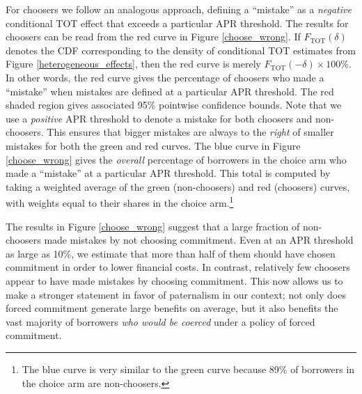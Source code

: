 \documentclass[11pt, a4paper]{article}
\begin{document}
For choosers we follow an analogous approach, defining a ``mistake'' as a \emph{negative} conditional TOT effect that exceeds a particular APR threshold.
The results for choosers can be read from the red curve in Figure \ref{choose_wrong}.
If $F_{\text{TOT}}(\delta)$ denotes the CDF corresponding to the density of conditional TOT estimates from Figure \ref{heterogeneous_effects}, then the red curve is merely $F_{\text{TOT}}(-\delta) \times 100\%$.
In other words, the red curve gives the percentage of choosers who made a ``mistake'' when mistakes are defined at a particular APR threshold.
The red shaded region gives associated 95\% pointwise confidence bounds.
Note that we use a \emph{positive} APR threshold to denote a mistake for both choosers and non-choosers. 
This ensures that bigger mistakes are always to the \emph{right} of smaller mistakes for both the green and red curves.
The blue curve in Figure \ref{choose_wrong} gives the \emph{overall} percentage of borrowers in the choice arm who made a ``mistake'' at a particular APR threshold.
This total is computed by taking a weighted average of the green (non-choosers) and red (choosers) curves, with weights equal to their shares in the choice arm.\footnote{The blue curve is very similar to the green curve because 89\% of borrowers in the choice arm are non-choosers.}



The results in Figure \ref{choose_wrong} suggest that a large fraction of non-choosers made mistakes by not choosing commitment.
Even at an APR threshold as large as 10\%, we estimate that more than half of them should have chosen commitment in order to lower financial costs.
In contrast, relatively few choosers appear to have made mistakes by choosing commitment.
This now allows us to make a stronger statement in favor of paternalism in our context; not only does forced commitment generate large benefits on average, but it also benefits the vast majority of borrowers \emph{who would be coerced} under a policy of forced commitment.
\end{document}
